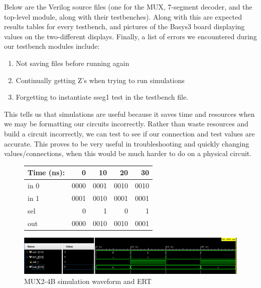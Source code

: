 \documentclass[11pt]{article}
\begin{document}
Below are the Verilog source files (one for the MUX, 7-segment decoder, and the top-level module, along with their testbenches). Along with this are expected results tables for every testbench, and pictures of the Basys3 board displaying values on the two-different displays. Finally, a list of errors we encountered during our testbench modules include:

\begin{enumerate}
	
	\item Not saving files before running again
	
	
	
	\item Continually getting Z's when trying to run simulations
	
	
	
	\item Forgetting to instantiate sseg1 test in the testbench file.
	
	
	
\end{enumerate} 

This tells us that simulations are useful because it saves time and resources when we may be formatting our circuits incorrectly. Rather than waste resources and build a circuit incorrectly, we can test to see if our connection and test values are accurate. This proves to be very useful in troubleshooting and quickly changing values/connections, when this would be much harder to do on a physical circuit.



\begin{figure}[ht]\centering
	\begin{tabular}{l|rrrr}
		Time (ns): & 0 & 10 & 20 & 30 \\
		\midrule 
		in 0 & 0000 & 0001 & 0010 & 0010 \\
		in 1 & 0001 & 0010 & 0001 & 0001 \\
		sel & 0 & 1 & 0 & 1 \\
		\bottomrule
		out & 0000 & 0010 &0010 &0001 
	\end{tabular}\medskip
	
	\includegraphics[width=1.0\textwidth]{MUX2_4B_TEST}
	\caption{MUX2-4B simulation waveform and ERT}
	\label{fig:sim_with_table}
\end{figure}
\end{document}
